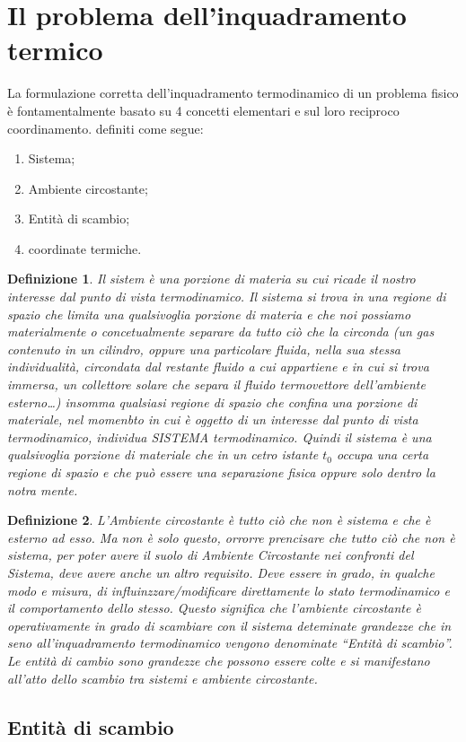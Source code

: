 \documentclass{book}
\newtheorem{defi}{Definizione}
\begin{document}
\section{Il problema dell'inquadramento termico\label{pro.inq.term}}
La formulazione corretta dell'inquadramento termodinamico di un problema fisico è fontamentalmente basato su 4
concetti elementari e sul loro reciproco coordinamento. definiti come segue:
\begin{enumerate}
\item Sistema;
\item Ambiente circostante;
\item Entità di scambio;
\item coordinate termiche.
\end{enumerate}
\begin{defi}
  Il sistem è una porzione di materia su cui ricade il nostro interesse dal punto di vista termodinamico.
  Il sistema si trova in una regione di spazio che limita una qualsivoglia porzione di materia e che noi possiamo
  materialmente o concetualmente separare da tutto ciò che la circonda (un gas contenuto in un cilindro,
  oppure una particolare fluida, nella sua stessa individualità, circondata dal restante fluido a cui appartiene
  e in cui si trova immersa, un collettore solare che separa il fluido termovettore dell'ambiente esterno\dots)
  insomma qualsiasi regione di spazio che confina una porzione di materiale, nel momenbto in cui è oggetto di un
  interesse dal punto di vista termodinamico, individua SISTEMA termodinamico. Quindi il sistema è una
  qualsivoglia porzione di materiale che in un cetro istante $t_0$ occupa una certa regione di spazio e che può
  essere una separazione fisica oppure solo dentro la notra mente.  
\end{defi}
\begin{defi}
  L'Ambiente circostante è tutto ciò che non è sistema e che è esterno ad esso. Ma non è solo questo, orrorre
  prencisare che tutto ciò che non è sistema, per poter avere il suolo di {\it Ambiente Circostante} nei
  confronti del Sistema, deve avere anche un altro requisito. Deve essere in grado, in qualche modo e misura,
  di influinzzare/modificare direttamente lo stato termodinamico e il comportamento dello stesso. Questo
  significa che l'ambiente circostante è operativamente in grado di scambiare con il sistema deteminate grandezze
  che in seno all'inquadramento termodinamico vengono denominate ``Entità di scambio''. Le entità di cambio sono
  grandezze che possono essere colte e si manifestano all'atto dello scambio tra sistemi e ambiente circostante.
\end{defi}
\subsection{Entità di scambio}
\end{document}
